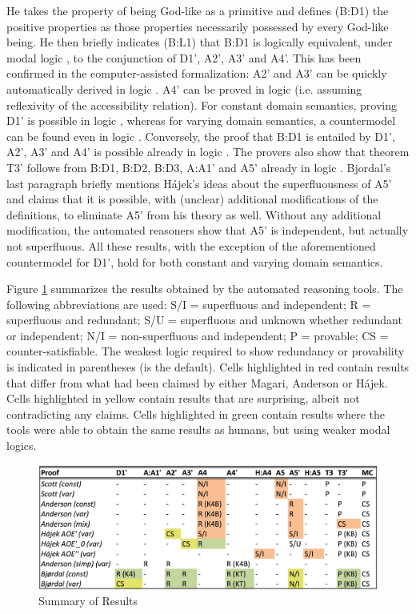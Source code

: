 \documentclass{birkjour}
\theoremstyle{definition}
\theoremstyle{remark}
\numberwithin{equation}{section}
\begin{document}
He takes the property of being God-like as a primitive and defines (B:D1) the positive properties as
those properties necessarily possessed by every God-like being. He
then briefly indicates (B:L1) that B:D1 is logically equivalent, under
modal logic \SFour, to the conjunction of D1', A2', A3' and A4'. This
has been confirmed in the computer-assisted formalization: A2' and A3'
can be quickly automatically derived in logic \K. A4' can be proved in
logic \KT (i.e. assuming reflexivity of the accessibility relation).
For constant domain semantics, proving D1' is possible in logic \KFour,
whereas for varying domain semantics, a countermodel can be found
even in logic \SFive. Conversely, the proof that B:D1 is entailed by
D1', A2', A3' and A4' is possible already in logic \K. The provers
also show that theorem T3' follows from B:D1, B:D2, B:D3, A:A1' and
A5' already in logic \KB. Bjordal's last paragraph briefly mentions
Hájek's ideas about the superfluousness of A5' and claims that it is
possible, with (unclear) additional modifications of the definitions,
to eliminate A5' from his theory as well. Without any additional
modification, the automated reasoners show that A5' is independent, but actually
not superfluous. All these results, with the exception of the
aforementioned countermodel for D1', hold for both constant and
varying domain semantics.

Figure \ref{fig:summary} summarizes the results obtained by the automated reasoning tools. The following abbreviations are used: S/I = superfluous and independent; R = superfluous and redundant; S/U = superfluous and unknown whether redundant or independent; N/I = non-superfluous and independent; P = provable; CS = counter-satisfiable. The weakest logic required to show redundancy or provability is indicated in parentheses (\K is the default).
Cells highlighted in red contain results that differ from what had been claimed by either Magari, Anderson or Hájek. Cells highlighted in yellow contain results that are surprising, albeit not contradicting any claims. Cells highlighted in green contain results where the tools were able to obtain the same results as humans, but using weaker modal logics.

\begin{figure}
\includegraphics[width=\textwidth]{Summary.png}
\caption{Summary of Results}
\label{fig:summary}
\end{figure}
\end{document}
